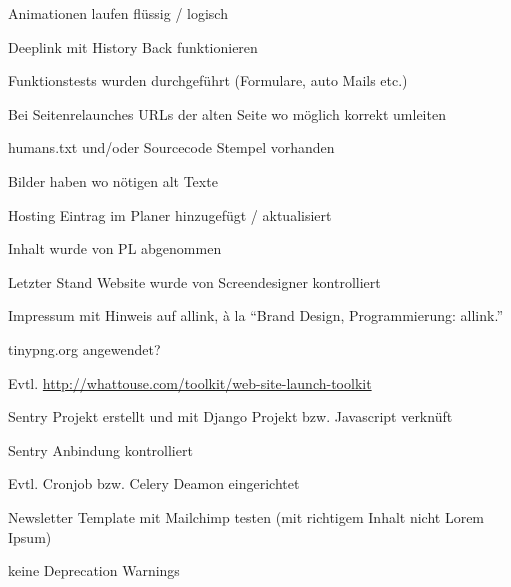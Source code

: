 \begin{checklist}
  \item Animationen laufen flüssig / logisch
  \item Deeplink mit History Back funktionieren
  \item Funktionstests wurden durchgeführt (Formulare, auto Mails etc.)
  \item Bei Seitenrelaunches URLs der alten Seite wo möglich korrekt umleiten
  \item humans.txt und/oder Sourcecode Stempel vorhanden
  \item Bilder haben wo nötigen alt Texte
  \item Hosting Eintrag im Planer hinzugefügt / aktualisiert
  \item Inhalt wurde von PL abgenommen
  \item Letzter Stand Website wurde von Screendesigner kontrolliert
  \item Impressum mit Hinweis auf allink, à la ``Brand Design, Programmierung: allink.''
  \item tinypng.org angewendet?
  \item Evtl. \url{http://whattouse.com/toolkit/web-site-launch-toolkit}
  \item Sentry Projekt erstellt und mit Django Projekt bzw. Javascript verknüft
  \item Sentry Anbindung kontrolliert
  \item Evtl. Cronjob bzw. Celery Deamon eingerichtet
  \item Newsletter Template mit Mailchimp testen (mit richtigem Inhalt nicht Lorem Ipsum)
  \item keine Deprecation Warnings
\end{checklist}